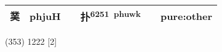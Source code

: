 \documentclass[14pt,a4paper]{scrartcl}
\begin{document}
\begin{longtable}[c]{@{}llllll@{}}
\begin{minipage}[t]{0.14\columnwidth}
菐
\strut\end{minipage} &
\begin{minipage}[t]{0.14\columnwidth}\raggedright\strut
phjuH
\strut\end{minipage} &
\begin{minipage}[t]{0.14\columnwidth}\raggedright\strut
\strut\end{minipage} &
\begin{minipage}[t]{0.14\columnwidth}\raggedright\strut
扑\textsuperscript{6251~phuwk}
\strut\end{minipage} &
\begin{minipage}[t]{0.14\columnwidth}\raggedright\strut
\strut\end{minipage} &
\begin{minipage}[t]{0.14\columnwidth}\raggedright\strut
pure:other
\strut\end{minipage}\tabularnewline
\bottomrule
\end{longtable}

(353) 1222 {[}2{]}
\end{document}
